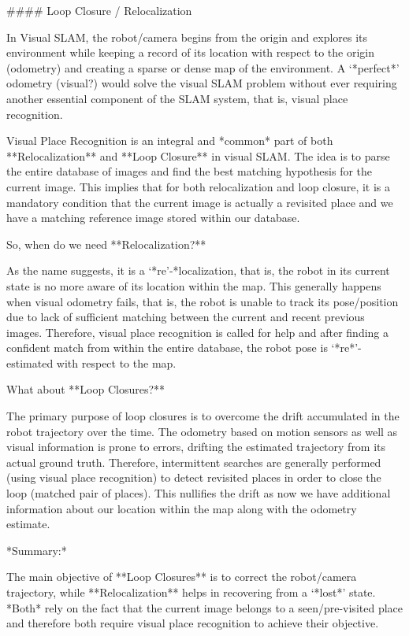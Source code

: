 #### Loop Closure / Relocalization

In Visual SLAM, the robot/camera begins from the origin and explores its environment while keeping a record of its location with respect to the origin (odometry) and creating a sparse or dense map of the environment. A ‘*perfect*’ odometry (visual?) would solve the visual SLAM problem without ever requiring another essential component of the SLAM system, that is, visual place recognition.

Visual Place Recognition is an integral and *common* part of both **Relocalization** and **Loop Closure** in visual SLAM. The idea is to parse the entire database of images and find the best matching hypothesis for the current image. This implies that for both relocalization and loop closure, it is a mandatory condition that the current image is actually a revisited place and we have a matching reference image stored within our database.

So, when do we need **Relocalization?**

As the name suggests, it is a ‘*re’-*localization, that is, the robot in its current state is no more aware of its location within the map. This generally happens when visual odometry fails, that is, the robot is unable to track its pose/position due to lack of sufficient matching between the current and recent previous images. Therefore, visual place recognition is called for help and after finding a confident match from within the entire database, the robot pose is ‘*re*’-estimated with respect to the map.

What about **Loop Closures?**

The primary purpose of loop closures is to overcome the drift accumulated in the robot trajectory over the time. The odometry based on motion sensors as well as visual information is prone to errors, drifting the estimated trajectory from its actual ground truth. Therefore, intermittent searches are generally performed (using visual place recognition) to detect revisited places in order to close the loop (matched pair of places). This nullifies the drift as now we have additional information about our location within the map along with the odometry estimate.

*Summary:*

The main objective of **Loop Closures** is to correct the robot/camera trajectory, while **Relocalization** helps in recovering from a ‘*lost*’ state. *Both* rely on the fact that the current image belongs to a seen/pre-visited place and therefore both require visual place recognition to achieve their objective.



